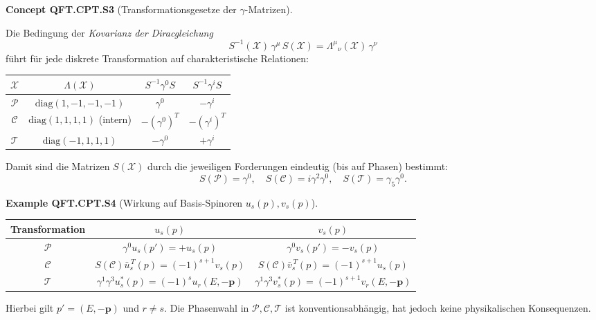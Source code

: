 \documentclass[10pt, letterpaper]{article}
\newcommand{\CustomHeading}[3]{%
  \par\medskip\noindent%
  \textbf{#1 #2} \textnormal{(#3)}.\enskip%
}
\newenvironment{EXA}[2]{\begin{unitbox}\CustomHeading{Example}{#1}{#2}}{\end{unitbox}}
\newenvironment{CONC}[2]{\begin{unitbox}\CustomHeading{Concept}{#1}{#2}}{\end{unitbox}}
\begin{document}
\begin{CONC}{QFT.CPT.S3}{Transformationsgesetze der $\gamma$-Matrizen}
Die Bedingung der \emph{Kovarianz der Diracgleichung}
\[
S^{-1}(\mathcal X)\,\gamma^\mu\,S(\mathcal X)=\Lambda^\mu{}_\nu(\mathcal X)\,\gamma^\nu
\]
führt für jede diskrete Transformation auf charakteristische Relationen:

\begin{center}
\renewcommand{\arraystretch}{1.4}
\begin{tabular}{|c|c|c|c|}
\hline
$\mathcal X$ & $\Lambda(\mathcal X)$ & $S^{-1}\gamma^0S$ & $S^{-1}\gamma^iS$ \\ \hline
$\mathcal P$ & $\mathrm{diag}(1,-1,-1,-1)$ & $\gamma^0$ & $-\gamma^i$ \\ \hline
$\mathcal C$ & $\mathrm{diag}(1,1,1,1)$ (intern) & $-(\gamma^0)^T$ & $-(\gamma^i)^T$ \\ \hline
$\mathcal T$ & $\mathrm{diag}(-1,1,1,1)$ & $-\gamma^0$ & $+\gamma^i$ \\ \hline
\end{tabular}
\end{center}

Damit sind die Matrizen $S(\mathcal X)$ durch die jeweiligen Forderungen eindeutig (bis auf Phasen) bestimmt:
\[
S(\mathcal P)=\gamma^0,\quad
S(\mathcal C)=i\gamma^2\gamma^0,\quad
S(\mathcal T)=\gamma_5\gamma^0.
\]
\end{CONC}

\begin{EXA}{QFT.CPT.S4}{Wirkung auf Basis-Spinoren $u_s(p),v_s(p)$}
\renewcommand{\arraystretch}{1.5}
\begin{center}
\begin{tabular}{|c|c|c|}
\hline
Transformation & $u_s(p)$ & $v_s(p)$ \\ \hline
$\mathcal P$ &
$\gamma^0u_s(p')=+u_s(p)$ &
$\gamma^0v_s(p')=-v_s(p)$ \\ \hline
$\mathcal C$ &
$S(\mathcal C)\bar u_s^{\,T}(p)=(-1)^{s+1}v_s(p)$ &
$S(\mathcal C)\bar v_s^{\,T}(p)=(-1)^{s+1}u_s(p)$ \\ \hline
$\mathcal T$ &
$\gamma^1\gamma^3u_s^*(p)=(-1)^s u_r(E,-\mathbf p)$ &
$\gamma^1\gamma^3v_s^*(p)=(-1)^{s+1} v_r(E,-\mathbf p)$ \\ \hline
\end{tabular}
\end{center}

\noindent
Hierbei gilt $p'=(E,-\mathbf p)$ und $r\neq s$.  
Die Phasenwahl in $\mathcal P,\mathcal C,\mathcal T$ ist konventionsabhängig, hat jedoch keine physikalischen Konsequenzen.
\end{EXA}
\end{document}
